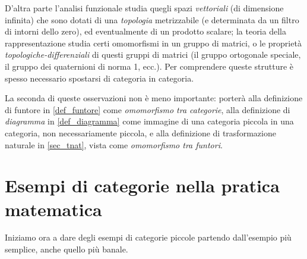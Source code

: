D'altra parte l'analisi funzionale studia quegli spazi \emph{vettoriali} (di dimensione infinita) che sono dotati di una \emph{topologia} metrizzabile (e determinata da un filtro di intorni dello zero), ed eventualmente di un prodotto scalare; la teoria della rappresentazione studia certi omomorfismi in un gruppo di matrici, o le proprietà \emph{topologiche-differenziali} di questi gruppi di matrici (il gruppo ortogonale speciale, il gruppo dei quaternioni di norma 1, ecc.). Per comprendere queste strutture è spesso necessario spostarsi di categoria in categoria.

La seconda di queste osservazioni non è meno importante: porterà alla definizione di funtore in \ref{def_funtore} come \emph{omomorfismo tra categorie}, alla definizione di \emph{diagramma} in \ref{def_diagramma} come immagine di una categoria piccola in una categoria, non necessariamente piccola, e alla definizione di trasformazione naturale in \ref{sec_tnat}, vista come \emph{omomorfismo tra funtori}.
\section{Esempi di categorie nella pratica matematica}\label{sec_esempi_cats}
Iniziamo ora a dare degli esempi di categorie piccole partendo dall'esempio più semplice, anche quello più banale.
